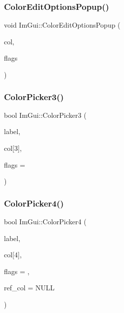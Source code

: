 \hypertarget{namespace_im_gui_a6bfb117816d669f8704e5d0c0c0795fe}{}\label{namespace_im_gui_a6bfb117816d669f8704e5d0c0c0795fe} 
\subsubsection{\texorpdfstring{Color\+Edit\+Options\+Popup()}{ColorEditOptionsPopup()}}
{\footnotesize\ttfamily void Im\+Gui\+::\+Color\+Edit\+Options\+Popup (\begin{DoxyParamCaption}\item[{const float $\ast$}]{col,  }\item[{Im\+Gui\+Color\+Edit\+Flags}]{flags }\end{DoxyParamCaption})}

\hypertarget{namespace_im_gui_a2a2a98cb9a17b18702be6b954670b388}{}\label{namespace_im_gui_a2a2a98cb9a17b18702be6b954670b388} 
\subsubsection{\texorpdfstring{Color\+Picker3()}{ColorPicker3()}}
{\footnotesize\ttfamily bool Im\+Gui\+::\+Color\+Picker3 (\begin{DoxyParamCaption}\item[{const char $\ast$}]{label,  }\item[{float}]{col\mbox{[}3\mbox{]},  }\item[{Im\+Gui\+Color\+Edit\+Flags}]{flags = {} }\end{DoxyParamCaption})}

\hypertarget{namespace_im_gui_a3d5aae9e0a14aa051d5a799abbe97b32}{}\label{namespace_im_gui_a3d5aae9e0a14aa051d5a799abbe97b32} 
\subsubsection{\texorpdfstring{Color\+Picker4()}{ColorPicker4()}}
{\footnotesize\ttfamily bool Im\+Gui\+::\+Color\+Picker4 (\begin{DoxyParamCaption}\item[{const char $\ast$}]{label,  }\item[{float}]{col\mbox{[}4\mbox{]},  }\item[{Im\+Gui\+Color\+Edit\+Flags}]{flags = {},  }\item[{const float $\ast$}]{ref\+\_\+col = {\ttfamily NULL} }\end{DoxyParamCaption})}

